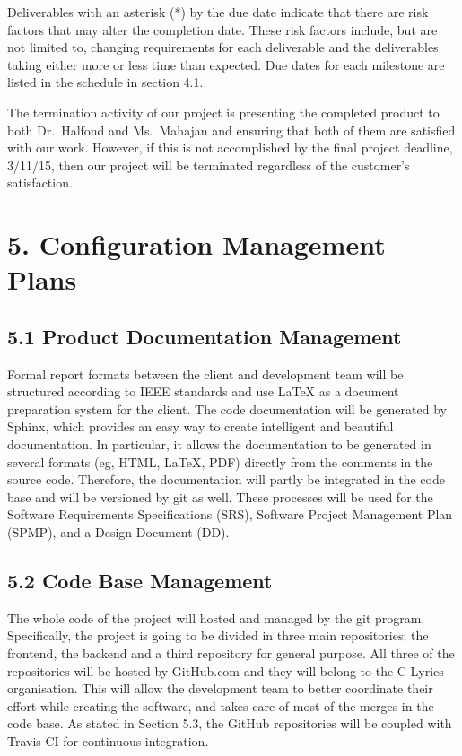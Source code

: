 \documentclass[]{article}
\begin{document}
Deliverables with an asterisk (*) by the due date indicate that there
are risk factors that may alter the completion date. These risk factors
include, but are not limited to, changing requirements for each
deliverable and the deliverables taking either more or less time than
expected. Due dates for each milestone are listed in the schedule in
section 4.1.

The termination activity of our project is presenting the completed
product to both Dr.~Halfond and Ms.~Mahajan and ensuring that both of
them are satisfied with our work. However, if this is not accomplished
by the final project deadline, 3/11/15, then our project will be
terminated regardless of the customer's satisfaction.

\section{5. Configuration Management
Plans}\label{configuration-management-plans}

\subsection{5.1 Product Documentation
Management}\label{product-documentation-management}

Formal report formats between the client and development team will be
structured according to IEEE standards and use LaTeX as a document
preparation system for the client. The code documentation will be
generated by Sphinx, which provides an easy way to create intelligent
and beautiful documentation. In particular, it allows the documentation
to be generated in several formats (eg, HTML, LaTeX, PDF) directly from
the comments in the source code. Therefore, the documentation will
partly be integrated in the code base and will be versioned by git as
well. These processes will be used for the Software Requirements
Specifications (SRS), Software Project Management Plan (SPMP), and a
Design Document (DD).

\subsection{5.2 Code Base Management}\label{code-base-management}

The whole code of the project will hosted and managed by the git
program. Specifically, the project is going to be divided in three main
repositories; the frontend, the backend and a third repository for
general purpose. All three of the repositories will be hosted by
GitHub.com and they will belong to the C-Lyrics organisation. This will
allow the development team to better coordinate their effort while
creating the software, and takes care of most of the merges in the code
base. As stated in Section 5.3, the GitHub repositories will be coupled
with Travis CI for continuous integration.
\end{document}
